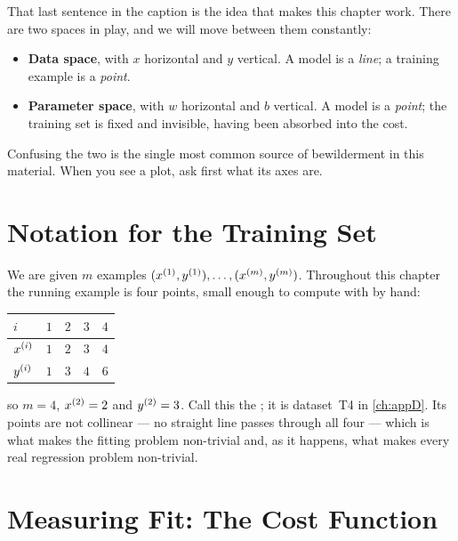 That last sentence in the caption is the idea that makes this chapter work.
There are two spaces in play, and we will move between them constantly:

\begin{itemize}
  \item \textbf{Data space}, with $x$ horizontal and $y$ vertical. A model is a
        \emph{line}; a training example is a \emph{point}.
  \item \textbf{Parameter space}, with $w$ horizontal and $b$ vertical. A model
        is a \emph{point}; the training set is fixed and invisible, having been
        absorbed into the cost.
\end{itemize}

Confusing the two is the single most common source of bewilderment in this
material. When you see a plot, ask first what its axes are.

\section{Notation for the Training Set}
\label{sec:notation}

We are given $m$ examples $(x^{(1)},y^{(1)}),\dots,(x^{(m)},y^{(m)})$. Throughout
this chapter the running example is four points, small enough to compute with by
hand:

\begin{center}
\small
\renewcommand{\arraystretch}{1.2}
\begin{tabular}{@{}lrrrr@{}}
\toprule
$i$      & $1$ & $2$ & $3$ & $4$\\
\midrule
$x^{(i)}$ & $1$ & $2$ & $3$ & $4$\\
$y^{(i)}$ & $1$ & $3$ & $4$ & $6$\\
\bottomrule
\end{tabular}
\end{center}

\noindent so $m = 4$, $x^{(2)} = 2$ and $y^{(2)} = 3$. Call this the
; it is dataset~T4 in \cref{ch:appD}. Its points are not
collinear --- no straight line passes through all four --- which is what makes
the fitting problem non-trivial and, as it happens, what makes every real
regression problem non-trivial.

\section{Measuring Fit: The Cost Function}
\label{sec:cost}

